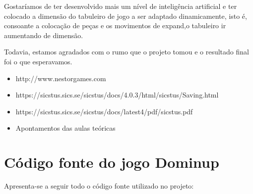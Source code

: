 \documentclass[a4paper]{article}
\begin{document}
Gostaríamos de ter desenvolvido mais um nível de inteligência artificial e ter colocado a dimensão do tabuleiro de jogo a ser adaptado dinamicamente, isto é, consoante a colocação de peças e os movimentos de expand,o tabuleiro ir aumentando de dimensão.

Todavia, estamos agradados com o rumo que o projeto tomou e o resultado final foi o que esperavamos.



\clearpage
{}
\renewcommand\refname{Bibliografia}


\begin{itemize}
	\item http://www.nestorgames.com
	\item https://sicstus.sics.se/sicstus/docs/4.0.3/html/sicstus/Saving.html
	\item https://sicstus.sics.se/sicstus/docs/latest4/pdf/sicstus.pdf
	\item Apontamentos das aulas teóricas
\end{itemize}

\newpage
\appendix
\section{Código fonte do jogo Dominup}
Apresenta-se a seguir todo o código fonte utilizado no projeto:
\end{document}
